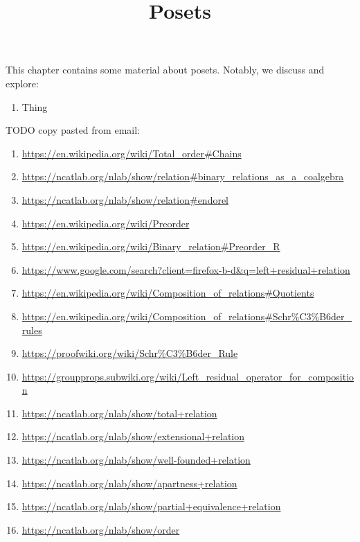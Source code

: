 

%



\title{Posets}

\maketitle

\label{section-phantom}

This chapter contains some material about posets. Notably, we discuss and explore:
\begin{enumerate}
    \item Thing
\end{enumerate}
TODO copy pasted from email:
\begin{enumerate}
    \item \url{https://en.wikipedia.org/wiki/Total_order#Chains}
    \item \url{https://ncatlab.org/nlab/show/relation#binary_relations_as_a_coalgebra}
    \item \url{https://ncatlab.org/nlab/show/relation#endorel}
    \item \url{https://en.wikipedia.org/wiki/Preorder}
    \item \url{https://en.wikipedia.org/wiki/Binary_relation#Preorder_R}
    \item \url{https://www.google.com/search?client=firefox-b-d&q=left+residual+relation}
    \item \url{https://en.wikipedia.org/wiki/Composition_of_relations#Quotients}
    \item \url{https://en.wikipedia.org/wiki/Composition_of_relations#Schr\%C3\%B6der_rules}
    \item \url{https://proofwiki.org/wiki/Schr\%C3\%B6der_Rule}
    \item \url{https://groupprops.subwiki.org/wiki/Left_residual_operator_for_composition}
    \item \url{https://ncatlab.org/nlab/show/total+relation}
    \item \url{https://ncatlab.org/nlab/show/extensional+relation}
    \item \url{https://ncatlab.org/nlab/show/well-founded+relation}
    \item \url{https://ncatlab.org/nlab/show/apartness+relation}
    \item \url{https://ncatlab.org/nlab/show/partial+equivalence+relation}
    \item \url{https://ncatlab.org/nlab/show/order}

\end{enumerate}
